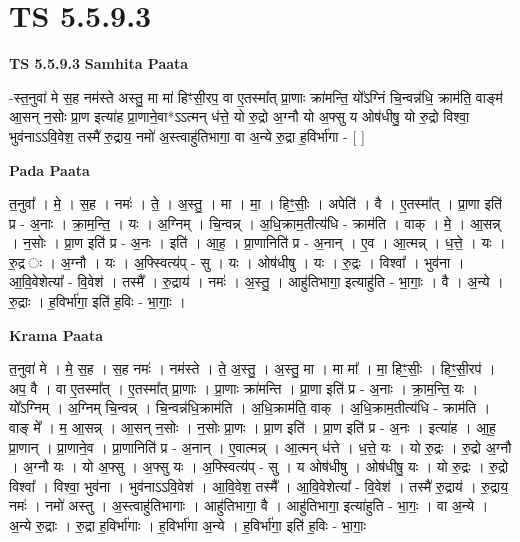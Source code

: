 \documentclass[17pt]{extarticle}
\begin{document}
\section{ TS 5.5.9.3 }

\textbf{TS 5.5.9.3 } \newline
\textbf{Samhita Paata} \newline

-स्त॒नुवा॑ मे स॒ह नम॑स्ते अस्तु॒ मा मा॑ हिꣳसी॒रप॒ वा ए॒तस्मा᳚त् प्रा॒णाः क्रा॑मन्ति॒ यो᳚ऽग्निं चि॒न्वन्न॑धि॒ क्राम॑ति॒ वाङ्म॑ आ॒सन् न॒सोः प्रा॒ण इत्या॑ह प्रा॒णाने॒वा*ऽऽत्मन् ध॑त्ते॒ यो रु॒द्रो अ॒ग्नौ यो अ॒फ्सु य ओष॑धीषु॒ यो रु॒द्रो विश्वा॒ भुव॑नाऽऽवि॒वेश॒ तस्मै॑ रु॒द्राय॒ नमो॑ अ॒स्त्वाहु॑तिभागा॒ वा अ॒न्ये रु॒द्रा ह॒विर्भा॑गा - [  ] \newline

\textbf{Pada Paata} \newline

त॒नुवा᳚ । मे॒ । स॒ह । नमः॑ । ते॒ । अ॒स्तु॒ । मा । मा॒ । हिꣳ॒॒सीः॒ । अपेति॑ । वै । ए॒तस्मा᳚त् । प्रा॒णा इति॑ प्र - अ॒नाः । क्रा॒म॒न्ति॒ । यः । अ॒ग्निम् । चि॒न्वन्न् । अ॒धि॒क्राम॒तीत्य॑धि - क्राम॑ति । वाक् । मे॒ । आ॒सन्न् । न॒सोः । प्रा॒ण इति॑ प्र - अ॒नः । इति॑ । आ॒ह॒ । प्रा॒णानिति॑ प्र - अ॒नान् । ए॒व । आ॒त्मन्न् । ध॒त्ते॒ । यः । रु॒द्र ः । अ॒ग्नौ । यः । अ॒फ्स्वित्य॑प् - सु । यः । ओष॑धीषु । यः । रु॒द्रः । विश्वा᳚ । भुव॑ना । आ॒वि॒वेशेत्या᳚ - वि॒वेश॑ । तस्मै᳚ । रु॒द्राय॑ । नमः॑ । अ॒स्तु॒ । आहु॑तिभागा॒ इत्याहु॑ति - भा॒गाः॒ । वै । अ॒न्ये । रु॒द्राः । ह॒विर्भा॑गा॒ इति॑ ह॒विः - भा॒गाः॒ ।  \newline


\textbf{Krama Paata} \newline

त॒नुवा॑ मे । मे॒ स॒ह । स॒ह नमः॑ । नम॑स्ते । ते॒ अ॒स्तु॒ । अ॒स्तु॒ मा । मा मा᳚ । मा॒ हिꣳ॒॒सीः॒ । हिꣳ॒॒सी॒रप॑ । अप॒ वै । वा ए॒तस्मा᳚त् । ए॒तस्मा᳚त् प्रा॒णाः । प्रा॒णाः क्रा॑मन्ति । प्रा॒णा इति॑ प्र - अ॒नाः । क्रा॒म॒न्ति॒ यः । यो᳚ऽग्निम् । अ॒ग्निम् चि॒न्वन्न् । चि॒न्वन्न॑धि॒क्राम॑ति । अ॒धि॒क्राम॑ति॒ वाक् । अ॒धि॒क्राम॒तीत्य॑धि - क्राम॑ति । वाङ् मे᳚ । म॒ आ॒सन्न् । आ॒सन् न॒सोः । न॒सोः प्रा॒णः । प्रा॒ण इति॑ । प्रा॒ण इति॑ प्र - अ॒नः । इत्या॑ह । आ॒ह॒ प्रा॒णान् । प्रा॒णाने॒व । प्रा॒णानिति॑ प्र - अ॒नान् । ए॒वात्मन्न् । आ॒त्मन् ध॑त्ते । ध॒त्ते॒ यः । यो रु॒द्रः । रु॒द्रो अ॒ग्नौ । अ॒ग्नौ यः । यो अ॒फ्सु । अ॒फ्सु यः । अ॒फ्स्वित्य॑प् - सु । य ओष॑धीषु । ओष॑धीषु॒ यः । यो रु॒द्रः । रु॒द्रो विश्वा᳚ । विश्वा॒ भुव॑ना । भुव॑नाऽऽवि॒वेश॑ । आ॒वि॒वेश॒ तस्मै᳚ । आ॒वि॒वेशेत्या᳚ - वि॒वेश॑ । तस्मै॑ रु॒द्राय॑ । रु॒द्राय॒ नमः॑ । नमो॑ अस्तु । अ॒स्त्वाहु॑तिभागाः । आहु॑तिभागा॒ वै । आहु॑तिभागा॒ इत्या॑हुति - भा॒गः॒ । वा अ॒न्ये । अ॒न्ये रु॒द्राः । रु॒द्रा ह॒विर्भा॑गाः । ह॒विर्भा॑गा अ॒न्ये । ह॒विर्भा॑गा॒ इति॑ ह॒विः - भा॒गाः॒ \newline
\end{document}
